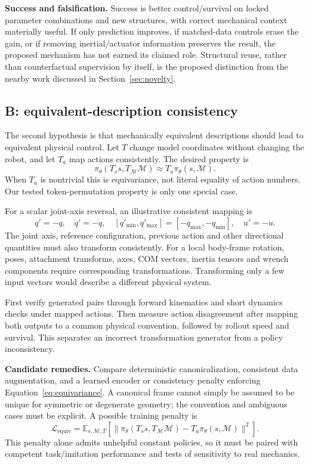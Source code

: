 \documentclass[11pt,letterpaper]{article}
\newcommand{\mech}{\mathcal{M}}
\newcommand{\policy}{\pi_\theta}
\begin{document}
\textbf{Success and falsification.} Success is better control/survival on locked
parameter combinations and new structures, with correct mechanical context
materially useful. If only prediction improves, if matched-data controls erase
the gain, or if removing inertial/actuator information preserves the result,
the proposed mechanism has not earned its claimed role. Structural reuse, rather
than counterfactual supervision by itself, is the proposed distinction from the
nearby work discussed in Section~\ref{sec:novelty}.

\subsection{B: equivalent-description consistency}
\label{sec:equivalence}
The second hypothesis is that mechanically equivalent descriptions should lead
to equivalent physical control. Let $T$ change model coordinates without changing
the robot, and let $T_a$ map actions consistently. The desired property is
\begin{equation}
 \policy(T_s s,T_\mech\mech)\approx T_a\policy(s,\mech).
 \label{eq:equivariance}
\end{equation}
When $T_a$ is nontrivial this is equivariance, not literal equality of action
numbers. Our tested token-permutation property is only one special case.

For a scalar joint-axis reversal, an illustrative consistent mapping is
\begin{equation}
 q'=-q,\quad \dot q'=-\dot q,\quad
 [q'_{\min},q'_{\max}]=[-q_{\max},-q_{\min}],\quad u'=-u.
\end{equation}
The joint axis, reference configuration, previous action and other directional
quantities must also transform consistently. For a local body-frame rotation,
poses, attachment transforms, axes, COM vectors, inertia tensors and wrench
components require corresponding transformations. Transforming only a few input
vectors would describe a different physical system.

First verify generated pairs through forward kinematics and short dynamics
checks under mapped actions. Then measure action disagreement after mapping both
outputs to a common physical convention, followed by rollout speed and survival.
This separates an incorrect transformation generator from a policy inconsistency.

\textbf{Candidate remedies.} Compare deterministic canonicalization, consistent
data augmentation, and a learned encoder or consistency penalty enforcing
Equation~\eqref{eq:equivariance}. A canonical frame cannot simply be assumed to be
unique for symmetric or degenerate geometry; the convention and ambiguous cases
must be explicit. A possible training penalty is
\begin{equation}
 \mathcal L_{\mathrm{equiv}}=
 \mathbb E_{s,\mech,T}\!\left[
 \|\policy(T_s s,T_\mech\mech)-T_a\policy(s,\mech)\|^2\right].
\end{equation}
This penalty alone admits unhelpful constant policies, so it must be paired with
competent task/imitation performance and tests of sensitivity to real mechanics.
\end{document}
